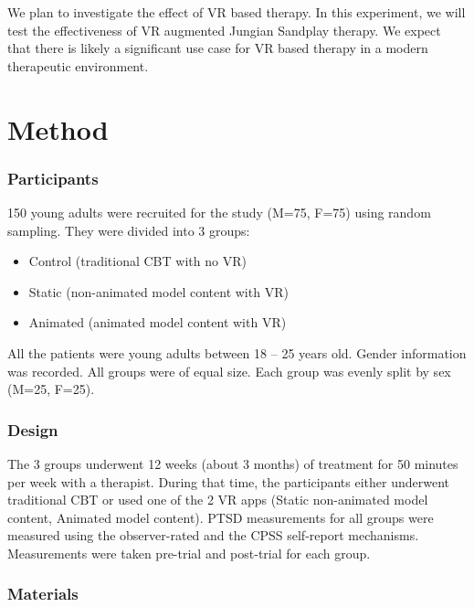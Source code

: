 \documentclass[
]{article}
\begin{document}
We plan to investigate the effect of VR based therapy. In this
experiment, we will test the effectiveness of VR augmented Jungian
Sandplay therapy. We expect that there is likely a significant use case
for VR based therapy in a modern therapeutic environment.

\hypertarget{method-1}{%
\section{Method}\label{method-1}}

\hypertarget{participants}{%
\subsubsection{\texorpdfstring{\textbf{Participants}}{Participants}}\label{participants}}

150 young adults were recruited for the study (M=75, F=75) using random
sampling. They were divided into 3 groups:

\begin{itemize}
\item
  Control (traditional CBT with no VR)
\item
  Static (non-animated model content with VR)
\item
  Animated (animated model content with VR)
\end{itemize}

All the patients were young adults between 18 -- 25 years old. Gender
information was recorded. All groups were of equal size. Each group was
evenly split by sex (M=25, F=25).

\hypertarget{design}{%
\subsubsection{\texorpdfstring{\textbf{Design}}{Design}}\label{design}}

The 3 groups underwent 12 weeks (about 3 months) of treatment for 50
minutes per week with a therapist. During that time, the participants
either underwent traditional CBT or used one of the 2 VR apps (Static
non-animated model content, Animated model content). PTSD measurements
for all groups were measured using the observer-rated and the CPSS
self-report mechanisms. Measurements were taken pre-trial and post-trial
for each group.

\hypertarget{materials}{%
\subsubsection{\texorpdfstring{\textbf{Materials}}{Materials}}\label{materials}}
\end{document}
